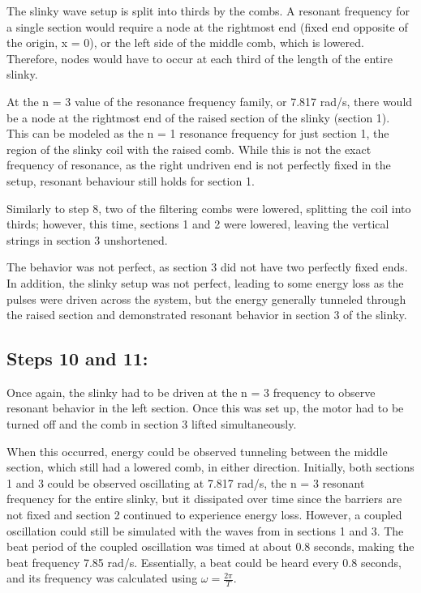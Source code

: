 \documentclass[12pt, letterpaper, twoside]{article}
\begin{document}
The slinky wave setup is split into thirds by the combs. A resonant frequency for a single section would require a node at the rightmost end (fixed end opposite of the origin, x = 0), or the left side of the middle comb, which is lowered. Therefore, nodes would have to occur at each third of the length of the entire slinky. 

At the n = 3 value of the resonance frequency family, or 7.817 rad/s, there would be a node at the rightmost end of the raised section of the slinky (section 1). This can be modeled as the n = 1 resonance frequency for just section 1, the region of the slinky coil with the raised comb. While this is not the exact frequency of resonance, as the right undriven end is not perfectly fixed in the setup, resonant behaviour still holds for section 1.

Similarly to step 8, two of the filtering combs were lowered, splitting the coil into thirds; however, this time, sections 1 and 2 were lowered, leaving the vertical strings in section 3 unshortened.

The behavior was not perfect, as section 3 did not have two perfectly fixed ends. In addition, the slinky setup was not perfect, leading to some energy loss as the pulses were driven across the system, but the energy generally tunneled through the raised section and demonstrated resonant behavior in section 3 of the slinky.

\subsection{Steps 10 and 11:}

Once again, the slinky had to be driven at the n = 3 frequency to observe resonant behavior in the left section. Once this was set up, the motor had to be turned off and the comb in section 3 lifted simultaneously.

When this occurred, energy could be observed tunneling between the middle section, which still had a lowered comb, in either direction. Initially, both sections 1 and 3 could be observed oscillating at 7.817 rad/s, the n = 3 resonant frequency for the entire slinky, but it dissipated over time since the barriers are not fixed and section 2 continued to experience energy loss. However, a coupled oscillation could still be simulated with the waves from in sections 1 and 3. The beat period of the coupled oscillation was timed at about 0.8 seconds, making the beat frequency 7.85 rad/s. Essentially, a beat could be heard every 0.8 seconds, and its frequency was calculated using $\omega = \frac{2\pi}{T}$. 
\end{document}
